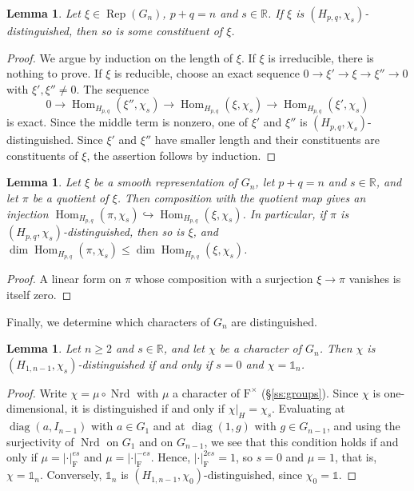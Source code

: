 \documentclass[11pt]{amsart}
\numberwithin{equation}{section}
\theoremstyle{plain}
\newtheorem{lemma}[theorem]{Lemma}
\theoremstyle{definition}
\theoremstyle{remark}
\newcommand{\R}{\mathbb{R}}
\newcommand{\one}{\mathds{1}}
\DeclareMathOperator{\Hom}{Hom}
\DeclareMathOperator{\Rep}{Rep}
\DeclareMathOperator{\Nrd}{Nrd}
\DeclareMathOperator{\diag}{diag}
\begin{document}
\begin{lemma}\label{lem:dist-constituent}
	Let $\xi\in\Rep(G_n)$, $p+q=n$ and $s\in\R$. If $\xi$ is $(H_{p,q},\chi_s)$-distinguished, then so is some constituent of $\xi$.
\end{lemma}

\begin{proof}
	We argue by induction on the length of $\xi$. If $\xi$ is irreducible, there is nothing to prove. If $\xi$ is reducible, choose an exact sequence $0\to\xi'\to\xi\to\xi''\to0$ with $\xi',\xi''\ne0$. The sequence
	$$
	0\to\Hom_{H_{p,q}}(\xi'',\chi_s)\to\Hom_{H_{p,q}}(\xi,\chi_s)\to\Hom_{H_{p,q}}(\xi',\chi_s)
	$$
	is exact. Since the middle term is nonzero, one of $\xi'$ and $\xi''$ is $(H_{p,q},\chi_s)$-distinguished. Since $\xi'$ and $\xi''$ have smaller length and their constituents are constituents of $\xi$, the assertion follows by induction.
\end{proof}

\begin{lemma}\label{lem:dist-quotient}
	Let $\xi$ be a smooth representation of $G_n$, let $p+q=n$ and $s\in\R$, and let $\pi$ be a quotient of $\xi$. Then composition with the quotient map gives an injection $\Hom_{H_{p,q}}(\pi,\chi_s)\hookrightarrow\Hom_{H_{p,q}}(\xi,\chi_s)$. In particular, if $\pi$ is $(H_{p,q},\chi_s)$-distinguished, then so is $\xi$, and $\dim\Hom_{H_{p,q}}(\pi,\chi_s)\le\dim\Hom_{H_{p,q}}(\xi,\chi_s)$.
\end{lemma}

\begin{proof}
	A linear form on $\pi$ whose composition with a surjection $\xi\to\pi$ vanishes is itself zero.
\end{proof}

Finally, we determine which characters of $G_n$ are distinguished.

\begin{lemma}\label{lem:char-dist}
	Let $n\ge2$ and $s\in\R$, and let $\chi$ be a character of $G_n$. Then $\chi$ is $(H_{1,n-1},\chi_s)$-distinguished if and only if $s=0$ and $\chi=\one_n$.
\end{lemma}

\begin{proof}
	Write $\chi=\mu\circ\Nrd$ with $\mu$ a character of $\mathrm{F}^\times$ (\S\ref{ss:groups}). Since $\chi$ is one-dimensional, it is distinguished if and only if $\chi|_{H}=\chi_s$. Evaluating at $\diag(a,I_{n-1})$ with $a\in G_1$ and at $\diag(1,g)$ with $g\in G_{n-1}$, and using the surjectivity of $\Nrd$ on $G_1$ and on $G_{n-1}$, we see that this condition holds if and only if $\mu=|\cdot|_{\mathrm{F}}^{es}$ and $\mu=|\cdot|_{\mathrm{F}}^{-es}$. Hence, $|\cdot|_{\mathrm{F}}^{2es}=1$, so $s=0$ and $\mu=1$, that is, $\chi=\one_n$. Conversely, $\one_n$ is $(H_{1,n-1},\chi_0)$-distinguished, since $\chi_0=\one$.
\end{proof}
\end{document}

